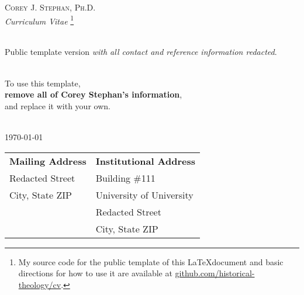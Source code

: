 \documentclass[letterpaper,12pt]{article}
\begin{document}
{
\begin{center}
  \Huge \textsc{Corey J. Stephan, Ph.D.} \\
  
  \normalsize \emph{Curriculum Vitae}
  \footnote{My source code for the public template of this \LaTeX\space document and basic directions for how to use it are available at \href{https:www.github.com/historical-theology/cv}{github.com/historical-theology/cv}.} \\ 						%

 \
  
	Public template version \emph{with all contact and reference information redacted}.\\
\

	To use this template, \\ \textbf{remove all of Corey Stephan's information}, \\ and replace it with your own.\\
	\
	

  \today
\end{center}

  \begin{center}
    \normalsize
      \faPhone{} \space 															
      \enspace\faEnvelope{} \space
      \enspace\faHome{}	
  \end{center}
%
\hspace*{-0.21cm}\begin{tabular}{p{3.7in}l}
\textbf{Mailing Address} 	& \textbf{Institutional Address} \\		
Redacted Street				& Building \#111 \\
City, State ZIP          	& University of University \\
							& Redacted Street \\
							& City, State ZIP
\end{tabular}



}
\end{document}
